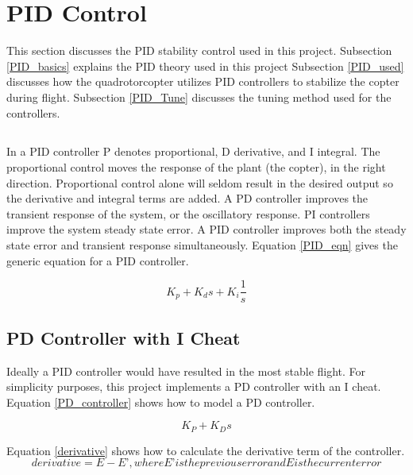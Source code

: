 \section{PID Control} %
This section discusses the PID stability control used in this project. 
Subsection \ref{PID_basics} explains the PID theory used in this project
Subsection \ref{PID_used} discusses how the quadrotorcopter utilizes PID controllers to stabilize the copter during flight.  Subsection \ref{PID_Tune} discusses the tuning method used for the controllers.


\subsection{\label{PID_basics}}

In a PID controller P denotes proportional, D derivative, and I integral. The proportional control moves the response of the plant (the copter), in the right direction. Proportional control alone will seldom result in the desired output so the derivative and integral terms are added. A PD controller improves the transient response of the system, or the oscillatory response.  PI controllers improve the system steady state error.  A PID controller improves both the steady state error and transient response simultaneously. Equation \ref{PID_eqn} gives the generic equation for a PID controller. 

\begin{equation}
K_p+K_ds + K_i\frac{1}{s}
\label{PID_eqn}
\end{equation}

\subsection{PD Controller with I Cheat\label{PID_used}}

Ideally a PID controller would have resulted in the most stable flight.  For simplicity purposes, this project implements a PD controller with an I cheat.  Equation \ref{PD_controller} shows how to model a PD controller.

\begin{equation}
K_P+K_Ds
\label{PD_controller}
\end{equation}

Equation \ref{derivative} shows how to calculate the derivative term of the controller. 
\begin{equation}
derivative = E-E’, where E’ is the previous error and E is the current error
\label{derivative}
\end{equation}







